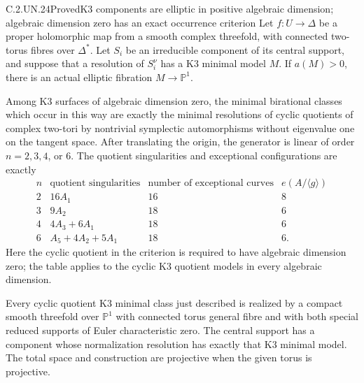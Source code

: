 \begin{statement}{C.2.UN.24}{Proved}{K3 components are elliptic in positive algebraic dimension; algebraic dimension zero has an exact occurrence criterion}
Let $f:U\to\Delta$ be a proper holomorphic map from a
smooth complex threefold, with connected two-torus fibres
over $\Delta^*$. Let $S_i$ be an irreducible component of
its central support, and suppose that a resolution of
$S_i^\nu$ has a K3 minimal model $M$.
If $a(M)>0$, there is an actual elliptic fibration
$M\to\mathbb P^1$.

Among K3 surfaces of algebraic dimension zero, the minimal
birational classes which occur in this way are exactly the
minimal resolutions of cyclic quotients of complex two-tori
by nontrivial symplectic automorphisms without eigenvalue
one on the tangent space. After translating the origin, the generator
is linear of order $n=2,3,4$, or $6$. The quotient singularities
and exceptional configurations are exactly
\[
\begin{array}{c|c|c|c}
n&\text{quotient singularities}&
 \text{number of exceptional curves}&e(A/\langle g\rangle)\\ \hline
2&16A_1&16&8\\
3&9A_2&18&6\\
4&4A_3+6A_1&18&6\\
6&A_5+4A_2+5A_1&18&6.
\end{array}                                                    \tag{C.K3.1}
\]
Here the cyclic quotient in the criterion is required to
have algebraic dimension zero; the table applies to the
cyclic K3 quotient models in every algebraic dimension.

Every cyclic quotient K3 minimal class just described is
realized by a compact smooth threefold over $\mathbb P^1$
with connected torus general fibre and with both special
reduced supports of Euler characteristic zero. The central
support has a component whose normalization resolution has
exactly that K3 minimal model. The total space and construction
are projective when the given torus is projective.
\end{statement}

